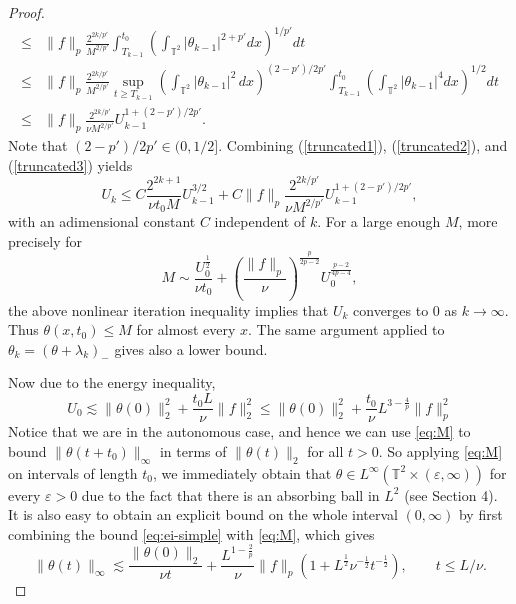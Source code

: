 \documentclass{amsart}
\numberwithin{Theorem}{section}
\theoremstyle{definition}
\theoremstyle{remark}
\renewcommand{\th}{\theta}
\begin{document}
\begin{proof}
\begin{equation}
\begin{split}
\leq &\|f\|_p\frac{2^{{2k/{p'}}}}{M^{2/{p'}}}\int_{T_{k-1}}^{t_0} \left(\int_{\mathbb T^2}|\theta_{k-1}|^{2+p'}dx\right)^{1/{p'}}dt\\
\leq &\|f\|_p\frac{2^{{2k/{p'}}}}{M^{2/{p'}}}\sup_{t\geq T_{k-1}}\left(\int_{\mathbb{T}^2}|\theta_{k-1}|^2\, dx\right)^{(2-p')/{2p'}}\int_{T_{k-1}}^{t_0} \left(\int_{\mathbb T^2}|\theta_{k-1}|^4dx\right)^{1/2}dt\\
\leq &\|f\|_p\frac{2^{{2k/{p'}}}}{\nu M^{2/{p'}}}U_{k-1}^{1+(2-p')/{2p'}}.
\end{split}
\end{equation}
Note that $(2-p')/{2p'}\in(0,1/2]$.
Combining (\ref{truncated1}), (\ref{truncated2}), and (\ref{truncated3}) yields
\begin{equation}\label{iteration}
U_k\leq C\frac{2^{2k+1}}{\nu t_0M}U_{k-1}^{3/2}+C\|f\|_p\frac{2^{{2k/{p'}}}}{\nu M^{2/{p'}}}U_{k-1}^{1+(2-p')/{2p'}},
\end{equation}
with an adimensional  constant $C$ independent of $k$. For a large enough $M$, more precisely for  
\begin{equation} \label{eq:M}
M \sim \frac{U_0^{\frac{1}{2}}}{\nu t_0} + \left(\frac{\|f\|_p}{\nu}\right)^{\frac{p}{2p-2}} U_0^{\frac{p-2}{4p-4}},
\end{equation}
the above nonlinear iteration inequality implies that $U_k$ converges to 0 as $k\to \infty$. Thus $\theta(x,t_0)\leq M$ for almost every $x$.
The same argument applied to $\theta_k=(\theta+\lambda_k)_-$ gives also
a lower bound.

Now due to the energy inequality,
\begin{equation} \label{eq:ei-simple}
U_0 \lesssim \|\th(0)\|_2^2 + \frac{t_0L}{\nu}\|f\|_2^2 \leq
\|\th(0)\|_2^2 + \frac{t_0}{\nu}L^{3-\frac4p}\|f\|_p^2
\end{equation}
Notice that we are in the autonomous case, and hence we can use \eqref{eq:M} to bound $\|\theta (t+t_0)\|_\infty$ in terms of
$\|\theta(t)\|_2$ for all $t>0$.
So applying \eqref{eq:M} on intervals of length $t_0$, we immediately obtain that $\th \in L^{\infty}({\mathbb T}^2 \times (\varepsilon,\infty) )$
for every $\varepsilon>0$ due to the fact that there is an absorbing ball in $L^2$ (see
Section 4). It is also easy to obtain an explicit bound on the whole interval $(0,\infty)$
by first combining the bound \eqref{eq:ei-simple} with \eqref{eq:M}, which gives
\begin{equation} \label{eq:Linf-firstbound}
\|\theta(t)\|_\infty \lesssim \frac{\|\theta(0)\|_2}{\nu t} +\frac{L^{1-\frac2p}}{\nu} \|f\|_p(1+L^{\frac12}\nu^{-\frac12} t^{-\frac12}), \qquad t \leq L/\nu.
\end{equation}


\end{proof}
\end{document}
